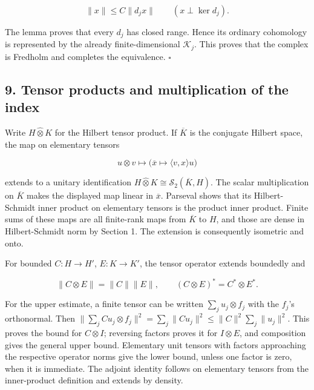 \documentclass[
  11pt,
]{article}
\begin{document}
\[
\|x\|\leq C\|d_jx\|\qquad(x\perp\ker d_j).
\]

The lemma proves that every \(d_j\) has closed range. Hence its ordinary
cohomology is represented by the already finite-dimensional
\(\mathcal K_j\). This proves that the complex is Fredholm and completes
the equivalence. \(\square\)

\subsection{9. Tensor products and multiplication of the
index}\label{tensor-products-and-multiplication-of-the-index}

Write \(H\widehat\otimes K\) for the Hilbert tensor product. If
\(\overline K\) is the conjugate Hilbert space, the map on elementary
tensors

\[
u\otimes v\longmapsto
\big(\overline x\longmapsto\langle v,x\rangle u\big)           \tag{T38}
\]

extends to a unitary identification
\(H\widehat\otimes K\cong\mathcal S_2(\overline K,H)\). The scalar
multiplication on \(\overline K\) makes the displayed map linear in
\(\overline x\). Parseval shows that its Hilbert-Schmidt inner product
on elementary tensors is the product inner product. Finite sums of these
maps are all finite-rank maps from \(\overline K\) to \(H\), and those
are dense in Hilbert-Schmidt norm by Section 1. The extension is
consequently isometric and onto.

For bounded \(C:H\to H'\), \(E:K\to K'\), the tensor operator extends
boundedly and

\[
\|C\otimes E\|=\|C\|\|E\|,\qquad
(C\otimes E)^*=C^*\otimes E^*.                              \tag{T39}
\]

For the upper estimate, a finite tensor can be written
\(\sum_j u_j\otimes f_j\) with the \(f_j\)'s orthonormal. Then
\(\|\sum_j Cu_j\otimes f_j\|^2=\sum_j\|Cu_j\|^2\leq\|C\|^2\sum_j\|u_j\|^2\).
This proves the bound for \(C\otimes I\); reversing factors proves it
for \(I\otimes E\), and composition gives the general upper bound.
Elementary unit tensors with factors approaching the respective operator
norms give the lower bound, unless one factor is zero, when it is
immediate. The adjoint identity follows on elementary tensors from the
inner-product definition and extends by density.
\end{document}
